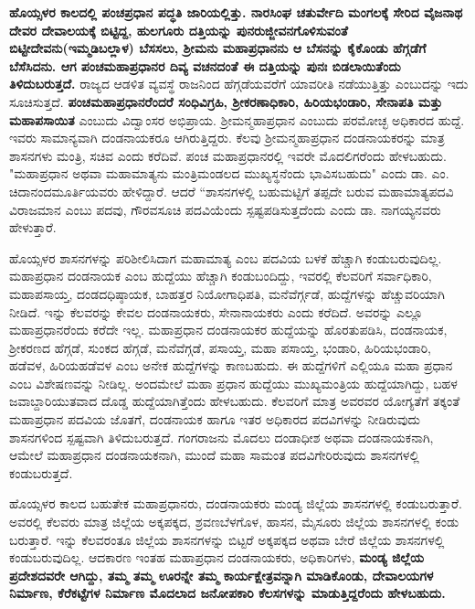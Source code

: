 \textbf{ಹೊಯ್ಸಳರ ಕಾಲದಲ್ಲಿ ಪಂಚಪ್ರಧಾನ ಪದ್ಧತಿ ಜಾರಿಯಲ್ಲಿತ್ತು. ನಾರಸಿಂಘ ಚತುರ್ವೇದಿ ಮಂಗಲಕ್ಕೆ ಸೇರಿದ ವೈಜನಾಥ ದೇವರ ದೇವಾಲಯಕ್ಕೆ ಬಿಟ್ಟಿದ್ದ, ಹುಲಗೂರು ದತ್ತಿಯನ್ನು ಪುನರುಜ್ಜೀವನಗೊಳಿಸುವಂತೆ ಬಿಟ್ಟೀದೇವನು(ಇಮ್ಮಡಿಬಲ್ಲಾಳ) ಬೆಸಸಲು, ಶ‍್ರೀಮನು ಮಹಾಪ್ರಧಾನನು ಆ ಬೆಸನನ್ನು ಕೈಕೊಂಡು ಹೆಗ್ಗಡೆಗೆ ಬೆಸೆಸಿದನು. ಆಗ ಪಂಚಮಹಾಪ್ರಧಾನರ ದಿವ್ಯ ವಚನದಂತೆ ಈ ದತ್ತಿಯನ್ನು ಪುನಃ ಬಿಡಲಾಯಿತೆಂದು ತಿಳಿದುಬರುತ್ತದೆ.} ರಾಜ್ಯದ ಆಡಳಿತ ವ್ಯವಸ್ಥೆ ರಾಜನಿಂದ ಹೆಗ್ಗಡೆಯವರೆಗೆ ಯಾವರೀತಿ ನಡೆಯುತ್ತಿತ್ತು ಎಂಬುದನ್ನು ಇದು ಸೂಚಿಸುತ್ತದೆ. \textbf{ಪಂಚಮಹಾಪ್ರಧಾನರೆಂದರೆ ಸಂಧಿವಿಗ್ರಹಿ, ಶ‍್ರೀಕರಣಾಧಿಕಾರಿ, ಹಿರಿಯಭಂಡಾರಿ, ಸೇನಾಪತಿ ಮತ್ತು ಮಹಾಪಸಾಯಿತ} ಎಂಬುದು ವಿದ್ವಾಂಸರ ಅಭಿಪ್ರಾಯ. ಶ‍್ರೀಮನ್ಮಹಾಪ್ರಧಾನ ಎಂಬುದು ಪರಮೋಚ್ಛ ಅಧಿಕಾರದ ಹುದ್ದೆ. ಇವರು ಸಾಮಾನ್ಯವಾಗಿ ದಂಡನಾಯಕರೂ ಆಗಿರುತ್ತಿದ್ದರು. ಕೆಲವು ಶ‍್ರೀಮನ್ಮಹಾಪ್ರಧಾನ ದಂಡನಾಯಕರನ್ನು ಮಾತ್ರ ಶಾಸನಗಳು ಮಂತ್ರಿ, ಸಚಿವ ಎಂದು ಕರೆದಿವೆ. ಪಂಚ ಮಹಾಪ್ರಧಾನ\-ರಲ್ಲಿ ಇವರೇ ಮೊದಲಿಗರೆಂದು ಹೇಳಬಹುದು. "ಮಹಾಪ್ರಧಾನ ಅಥವಾ ಮಹಾಮಾತ್ಯನು ಮಂತ್ರಿಮಂಡಲದ ಮುಖ್ಯಸ್ಥನೆಂದು ಭಾವಿಸಬಹುದು" ಎಂದು ಡಾ. ಎಂ. ಚಿದಾನಂದಮೂರ್ತಿಯವರು ಹೇಳಿದ್ದಾರೆ. ಆದರೆ “ಶಾಸನ\-ಗಳಲ್ಲಿ ಬಹುಮಟ್ಟಿಗೆ ತಪ್ಪದೇ ಬರುವ ಮಹಾಮಾತ್ಯಪದವಿ ವಿರಾಜಮಾನ ಎಂಬು ಪದವು, ಗೌರವಸೂಚಿ ಪದವಿಯೆಂದು ಸ್ಪಷ್ಟಪಡಿಸುತ್ತದೆಂದು ಎಂದು ಡಾ. ನಾಗಯ್ಯನವರು ಹೇಳುತ್ತಾರೆ.

ಹೊಯ್ಸಳರ ಶಾಸನಗಳನ್ನು ಪರಿಶೀಲಿಸಿದಾಗ ಮಹಾಮಾತ್ಯ ಎಂಬ ಪದವಿಯ ಬಳಕೆ ಹೆಚ್ಚಾಗಿ ಕಂಡುಬರುವುದಿಲ್ಲ. ಮಹಾಪ್ರಧಾನ ದಂಡನಾಯಕ ಎಂಬ ಹುದ್ದೆಯು ಹೆಚ್ಚಾಗಿ ಕಂಡುಬಂದಿದ್ದು, ಇವರಲ್ಲಿ ಕೆಲವರಿಗೆ ಸರ್ವಾಧಿಕಾರಿ, ಮಹಾಪಸಾಯ್ತ, ದಂಡದಧಿಷ್ಠಾಯಕ, ಬಾಹತ್ತರ ನಿಯೋಗಾಧಿಪತಿ, ಮನೆವೆರ್ಗ್ಗಡೆ, ಹುದ್ದೆಗಳನ್ನು ಹೆಚ್ಚುವರಿಯಾಗಿ ನೀಡಿದೆ. ಇನ್ನು ಕೆಲವರನ್ನು ಕೇವಲ ದಂಡನಾಯಕರು, ಸೇನಾನಾಯಕರು ಎಂದು ಕರೆದಿದೆ. ಅವರನ್ನು ಎಲ್ಲೂ ಮಹಾಪ್ರಧಾನರೆಂದು ಕರೆದೇ ಇಲ್ಲ. ಮಹಾಪ್ರಧಾನ ದಂಡನಾಯಕರ ಹುದ್ದೆಯನ್ನು ಹೊರತುಪಡಿಸಿ, ದಂಡನಾಯಕ, ಶ‍್ರೀಕರಣದ ಹೆಗ್ಗಡೆ, ಸುಂಕದ ಹೆಗ್ಗಡೆ, ಮನೆವೆಗ್ಗಡೆ, ಪಸಾಯ್ತ, ಮಹಾ ಪಸಾಯ್ತ, ಭಂಡಾರಿ, ಹಿರಿಯಭಂಡಾರಿ, ಹಡೆವಳ, ಹಿರಿಯಹಡೆವಳ ಎಂಬ ಅನೇಕ ಹುದ್ದೆಗಳನ್ನು ಕಾಣಬಹುದು. ಈ ಹುದ್ದೆಗಳಿಗೆ ಎಲ್ಲಿಯೂ ಮಹಾ ಪ್ರಧಾನ ಎಂಬ ವಿಶೇಷಣವನ್ನು ನೀಡಿಲ್ಲ. ಅಂದಮೇಲೆ ಮಹಾ ಪ್ರಧಾನ ಹುದ್ದೆಯು ಮುಖ್ಯಮಂತ್ರಿಯ ಹುದ್ದೆಯಾಗಿದ್ದು, ಬಹಳ ಜವಾಬ್ದಾರಿಯುತವಾದ ದೊಡ್ಡ ಹುದ್ದೆಯಾಗಿತ್ತೆಂದು ಹೇಳಬಹುದು. ಕೆಲವರಿಗೆ ಮಾತ್ರ ಅವರವರ ಯೋಗ್ಯತೆಗೆ ತಕ್ಕಂತೆ ಮಹಾಪ್ರಧಾನ ಪದವಿಯ ಜೊತಗೆ, ದಂಡನಾಯಕ ಹಾಗೂ ಇತರ ಅಧಿಕಾರದ ಪದವಿಗಳನ್ನು ನೀಡಿರುವುದು ಶಾಸನಗಳಿಂದ ಸ್ಪಷ್ಟವಾಗಿ ತಿಳಿದುಬರುತ್ತದೆ. ಗಂಗರಾಜನು ಮೊದಲು ದಂಡಾಧೀಶ ಅಥವಾ ದಂಡನಾಯಕನಾಗಿ, ಆಮೇಲೆ ಮಹಾಪ್ರಧಾನ ದಂಡನಾಯಕನಾಗಿ, ಮುಂದೆ ಮಹಾ ಸಾಮಂತ ಪದವಿಗೇರಿರುವುದು ಶಾಸನಗಳಲ್ಲಿ ಕಂಡುಬರುತ್ತದೆ.

ಹೊಯ್ಸಳರ ಕಾಲದ ಬಹುತೇಕ ಮಹಾಪ್ರಧಾನರು, ದಂಡನಾಯಕರು ಮಂಡ್ಯ ಜಿಲ್ಲೆಯ ಶಾಸನಗಳಲ್ಲಿ ಕಂಡು\-ಬರುತ್ತಾರೆ. ಅವರಲ್ಲಿ ಕೆಲವರು ಮಾತ್ರ ಜಿಲ್ಲೆಯ ಅಕ್ಕಪಕ್ಕದ, ಶ್ರವಣಬೆಳಗೊಳ, ಹಾಸನ, ಮೈಸೂರು ಜಿಲ್ಲೆಯ ಶಾಸನಗಳಲ್ಲಿ ಕಂಡು ಬರುತ್ತಾರೆ. ಇನ್ನು ಕೆಲವರಂತೂ ಜಿಲ್ಲೆಯ ಶಾಸನಗಳನ್ನು ಬಿಟ್ಟರೆ ಅಕ್ಕಪಕ್ಕದ ಅಥವಾ ಬೇರೆ ಜಿಲ್ಲೆಯ ಶಾಸನಗಳಲ್ಲಿ ಕಂಡುಬರುವುದಿಲ್ಲ. ಆದಕಾರಣ ಇಂತಹ ಮಹಾಪ್ರಧಾನ ದಂಡನಾಯಕರು, ಅಧಿಕಾರಿಗಳು, \textbf{ಮಂಡ್ಯ ಜಿಲ್ಲೆಯ ಪ್ರದೇಶದವರೇ ಆಗಿದ್ದು, ತಮ್ಮ ತಮ್ಮ ಊರನ್ನೇ ತಮ್ಮ ಕಾರ್ಯಕ್ಷೇತ್ರವನ್ನಾಗಿ ಮಾಡಿಕೊಂಡು, ದೇವಾಲಯಗಳ ನಿರ್ಮಾಣ, ಕೆರೆಕಟ್ಟೆಗಳ ನಿರ್ಮಾಣ ಮೊದಲಾದ ಜನೋಪಕಾರಿ ಕೆಲಸಗಳನ್ನು ಮಾಡುತ್ತಿದ್ದರೆಂದು ಹೇಳಬಹುದು.}

